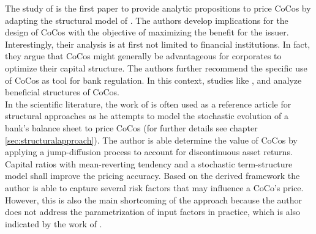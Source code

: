 



The study of \citet{albul2010contingent} is the first paper to provide analytic propositions to price CoCos by adapting the structural model of \citet{leland1994corporate}. The authors develop implications for the design of CoCos with the objective of maximizing the benefit for the issuer. Interestingly, their analysis is at first not limited to financial institutions. In fact, they argue that CoCos might generally be advantageous for corporates to optimize their capital structure. The authors further recommend the specific use of CoCos as tool for bank regulation. In this context, studies like \citet{madan2011conic}, \citet{hilscher2014bank} and \citet{sundaresan2015design} analyze beneficial structures of CoCos.\\

In the scientific literature, the work of \citet{pennacchi2010structural} is often used as a reference article for structural approaches as he attempts to model the stochastic evolution of a bank's balance sheet to price CoCos (for further details see chapter \ref{sec:structuralapproach}). The author is able determine the value of CoCos by applying a jump-diffusion process to account for discontinuous asset returns. Capital ratios with mean-reverting tendency and a stochastic term-structure model shall improve the pricing accuracy. Based on the derived framework the author is able to capture several risk factors that may influence a CoCo's price. However, this is also the main shortcoming of the approach because the author does not address the parametrization of input factors in practice, which is also indicated by the work of \citet{erismann2015pricing}.\\

